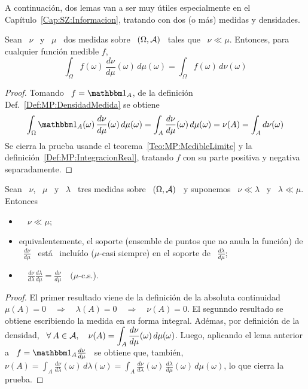 A  continuaci\'on,  dos  lemas  van  a  ser muy  \'utiles  especialmente  en  el
Cap\'itulo~\ref{Cap:SZ:Informacion},  tratando  con  dos  (o  m\'as)  medidas  y
densidades.
%
\begin{lema}
\label{Lem:RelacionIntegracionDerivadasRadon}
%
  Sean \  $\nu$ \ y \  $\mu$ \ dos medidas  sobre \ $(\Omega,\mathcal{A})$ \  tales que \
  $\nu \ll \mu$. Entonces, para cualquier funci\'on medible $f$,
  \[
  \int_\Omega   f(\omega)  \,   \frac{d\nu}{d\mu}(\omega)   \,  d\mu(\omega)   =
  \int_\Omega f(\omega) \, d\nu(\omega)
  \]
\end{lema}
%
\begin{proof}
  Tomando \ $f =  \un_A$, de la definici\'on Def.~\ref{Def:MP:DensidadMedida} se
  obtiene
  \[
  \int_\Omega  \un_A(\omega)  \,  \frac{d\nu}{d\mu}(\omega)  \,  d\mu(\omega)  =
  \int_A   \frac{d\nu}{d\mu}(\omega)   \,  d\mu(\omega)   =   \nu(A)  =   \int_A
  d\nu(\omega)
  \]
  Se  cierra  la  prueba   usande  el  teorema~\ref{Teo:MP:MedibleLimite}  y  la
  definici\'on~\ref{Def:MP:IntegracionReal}, tratando $f$  con su parte positiva
  y negativa separadamente.
\end{proof}
%
\begin{lema}
\label{Lem:RelacionesDerivadasRadon}
%
  Sean \ $\nu$, \ $\mu$ \ y \ $\lambda$ \ tres medidas sobre \ $(\Omega,\mathcal{A})$ \ y
  suponemos \ $\nu \ll \lambda$ \ y \ $\lambda \ll \mu$. Entonces
  \begin{itemize}
  \item $\quad \nu \ll \mu$;
  \item  equivalentemente,  el soporte  (ensemble  de  puntos  que no  anula  la
    funci\'on)  de \  $\displaystyle  \frac{d\nu}{d\mu}$ \  est\'a \  inclu\'ido
    ($\mu$-casi    siempre)    en     el    soporte    de    \    $\displaystyle
    \frac{d\lambda}{d\mu}$;
  \item  $\quad   \displaystyle  \frac{d\nu}{d\lambda}  \frac{d\lambda}{d\mu}  =
    \frac{d\nu}{d\mu} \quad (\mu$-c.s.).
\end{itemize}
\end{lema}
%
\begin{proof}
  El  primer resultado  viene  de  la definici\'on  de  la absoluta  continuidad
  $\mu(A) =  0 \quad  \Rightarrow \quad \lambda(A)  = 0 \quad  \Rightarrow \quad
  \nu(A) =  0$. El  segunndo resultado  se obtiene escribiendo  la medida  en su
  forma integral.  Ad\'emas, por definici\'on  de la densidad,  \ $\displaystyle
  \forall  \: A  \in  \mathcal{A},  \quad \nu(A)  =  \int_A \frac{d\nu}{d\mu}(\omega)  \,
  d\mu(\omega)$.   Luego,   aplicando  el   lema  anterior  a   \  $f   =  \un_A
  \frac{d\nu}{d\mu}$  \  se  obtiene  que,   tambi\'en,  \  $  \nu(A)  =  \int_A
  \frac{d\nu}{d\lambda}(\omega)      \,      d\lambda(\omega)      =      \int_A
  \frac{d\nu}{d\lambda}(\omega)      \,     \frac{d\lambda}{d\mu}(\omega)     \,
  d\mu(\omega)$, lo que cierra la prueba.
\end{proof}

